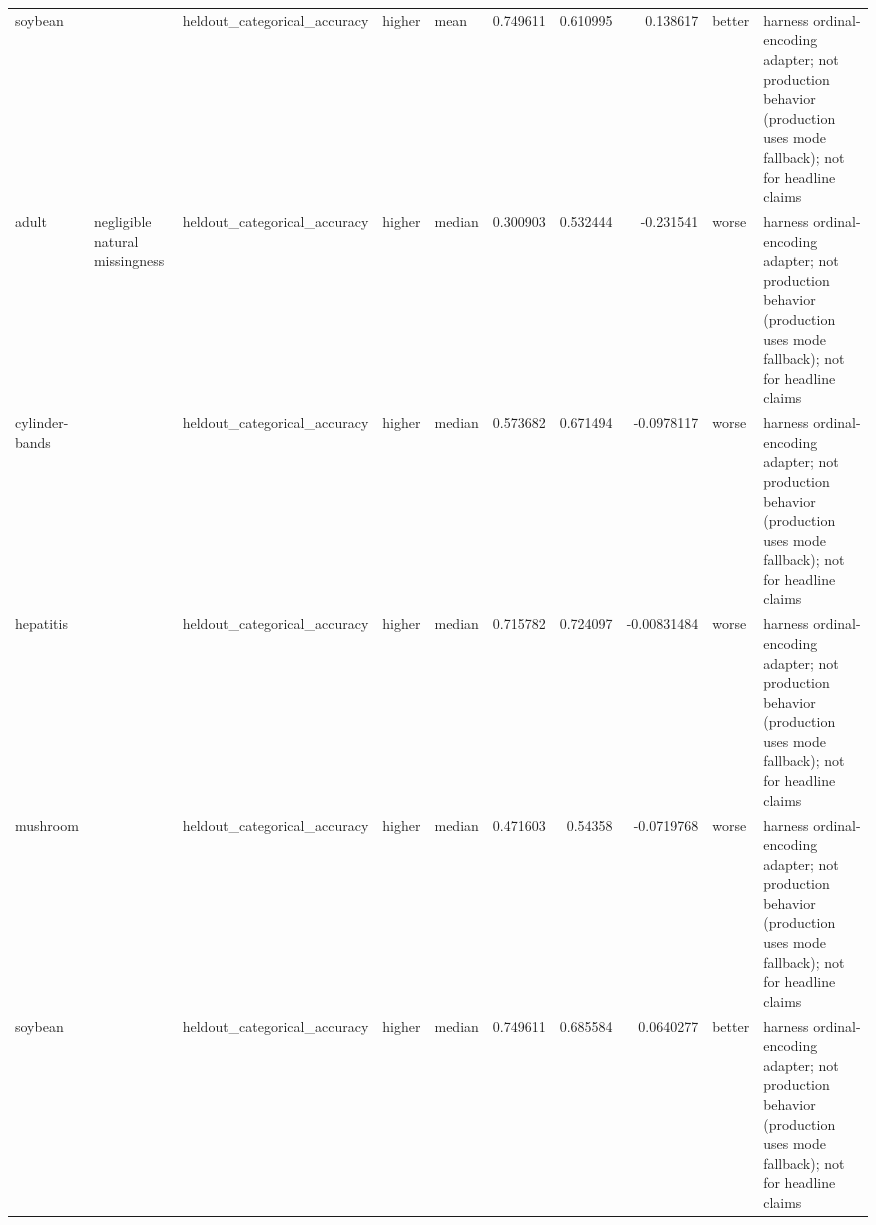 \begin{table}[ht]
{\begin{tabular}{lllllrrrll}
 soybean        &                                                                       & heldout\_categorical\_accuracy   & higher             & mean             &                   0.749611 &               0.610995 &                     0.138617    & better               & harness ordinal-encoding adapter; not production behavior (production uses mode fallback); not for headline claims \\
 adult          & negligible natural missingness                                        & heldout\_categorical\_accuracy   & higher             & median           &                   0.300903 &               0.532444 &                    -0.231541    & worse                & harness ordinal-encoding adapter; not production behavior (production uses mode fallback); not for headline claims \\
 cylinder-bands &                                                                       & heldout\_categorical\_accuracy   & higher             & median           &                   0.573682 &               0.671494 &                    -0.0978117   & worse                & harness ordinal-encoding adapter; not production behavior (production uses mode fallback); not for headline claims \\
 hepatitis      &                                                                       & heldout\_categorical\_accuracy   & higher             & median           &                   0.715782 &               0.724097 &                    -0.00831484  & worse                & harness ordinal-encoding adapter; not production behavior (production uses mode fallback); not for headline claims \\
 mushroom       &                                                                       & heldout\_categorical\_accuracy   & higher             & median           &                   0.471603 &               0.54358  &                    -0.0719768   & worse                & harness ordinal-encoding adapter; not production behavior (production uses mode fallback); not for headline claims \\
 soybean        &                                                                       & heldout\_categorical\_accuracy   & higher             & median           &                   0.749611 &               0.685584 &                     0.0640277   & better               & harness ordinal-encoding adapter; not production behavior (production uses mode fallback); not for headline claims \\

\end{tabular}}
\end{table}
